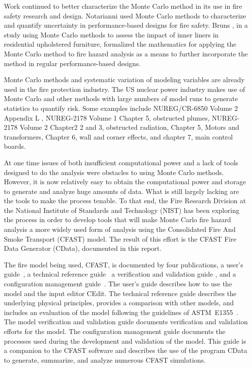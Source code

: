 \documentclass[12pt,twoside]{book}
\begin{document}
Work continued to better characterize the Monte Carlo method in its use in fire safety research and design. Notarianni \cite{Notarianni:2000} used Monte Carlo methods to characterize and quantify uncertainty in performance-based designs for fire safety. Bruns \cite{bruns_tn_2016}, in a study using Monte Carlo methods to assess the impact of inner liners in residential upholstered furniture, formalized the mathematics for applying the Monte Carlo method to fire hazard analysis as a means to further incorporate the method in regular performance-based designs.

Monte Carlo methods and systematic variation of modeling variables are already used in the fire protection industry. The US nuclear power industry makes use of Monte Carlo and other methods with large numbers of model runs to generate statistics to quantify risk. Some examples include NUREG/CR-6850 Volume 2 Appendix L \cite{NRCNUREGCR6850V2}, NUREG-2178 Volume 1 \cite{NRCNUREG2178V1} Chapter 5, obstructed plumes,  NUREG-2178 Volume 2 \cite{NRCNUREG2178V2} Chapter2 2 and 3, obstructed radiation, Chapter 5, Motors and transformers, Chapter 6, wall and corner effects, and chapter 7, main control boards.

At one time issues of both insufficient computational power and a lack of tools designed to do the analysis were obstacles to using Monte Carlo methods. However, it is now relatively easy to obtain the computational power and storage to generate and analyze huge amounts of data. What is still largely lacking are the tools to make the process tenable. To that end, the Fire Research Division at the National Institute of Standards and Technology (NIST) has been exploring the process \cite{NIST_TN_2041,Reneke_2017,Reneke_2018,Cleary_2019} in order to develop tools that will make Monte Carlo fire hazard analysis a more widely used form of analysis using the Consolidated Fire And Smoke Transport (CFAST) model. The result of this effort is the CFAST Fire Data Generator (CData), documented in this report.

The fire model being used, CFAST, is documented by four publications, a user's guide~\cite{CFAST_Users_Guide_7}, a technical reference guide~\cite{CFAST_Tech_Guide_7} a verification and validation guide \cite{CFAST_Valid_Guide_7}, and a configuration management guide~\cite{CFAST_Config_Guide_7}. The user's guide describes how to use the model and the input editor CEdit. The technical reference guide describes the underlying physical principles, provides a comparison with other models, and includes an evaluation of the model following the guidelines of ASTM~E1355~\cite{CFAST:ASTM:E1355}. The model verification and validation guide documents verification and validation efforts for the model. The configuration management guide documents the processes used during the development and validation of the model. This guide is a companion to the CFAST software and describes the use of the program CData to generate, summarize, and analyze numerous CFAST simulations.
\end{document}
